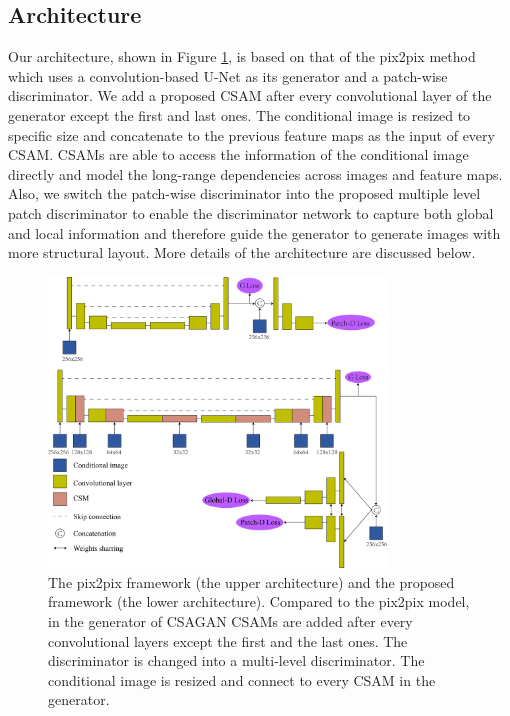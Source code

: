 \subsection{Architecture}
\label{subsec:architecture}
Our architecture, shown in Figure \ref{fig:architecture}, is based on that of the pix2pix method which uses a convolution-based U-Net \cite{Unet} as its generator and a patch-wise discriminator. We add a proposed CSAM after every convolutional layer of the generator except the first and last ones. The conditional image is resized to specific size and concatenate to the previous feature maps as the input of every CSAM. CSAMs are able to access the information of the conditional image directly and model the long-range dependencies across images and feature maps. Also, we switch the patch-wise discriminator into the proposed multiple level patch discriminator to enable the discriminator network to capture both global and local information and therefore guide the generator to generate images with more structural layout. More details of the architecture are discussed below.
%
\begin{figure}
	\includegraphics[width=0.8\textwidth]{figures/architecture}
	\caption{The pix2pix framework (the upper architecture) and the proposed framework (the lower architecture). Compared to the pix2pix model, in the generator of CSAGAN CSAMs are added after every convolutional layers except the first and the last ones. The discriminator is changed into a multi-level discriminator. The conditional image is resized and connect to every CSAM in the generator.}
	\label{fig:architecture}
\end{figure}
%
%
